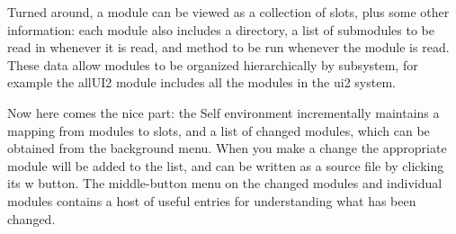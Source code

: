 \documentclass[letterpaper,10pt,english]{sphinxmanual}
\begin{document}
Turned around, a module can be viewed as a collection of slots, plus some other information: each
module also includes a directory, a list of submodules to be read in whenever it is read, and
 method to be run whenever the module is read. These data allow modules to be organized
hierarchically by subsystem, for example the allUI2 module includes all the modules in the ui2
system.

Now here comes the nice part: the Self environment incrementally maintains a mapping from modules
to slots, and a list of changed modules, which can be obtained from the background menu.
When you make a change the appropriate module will be added to the list, and can be written as a
source file by clicking its w button. The middle-button menu on the changed modules and individual
modules contains a host of useful entries for understanding what has been changed.
\end{document}
